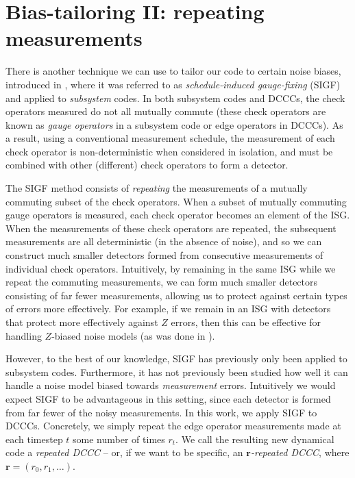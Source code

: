 \section{Bias-tailoring II: repeating measurements}\label{sec:gauge_dcccs}

There is another technique we can use to tailor our code to certain noise biases, introduced in , where it was referred to as \textit{schedule-induced gauge-fixing} (SIGF) and applied to \textit{subsystem} codes.
In both subsystem codes and DCCCs, the check operators measured do not all mutually commute (these check operators are known as \textit{gauge operators} in a subsystem code or edge operators in DCCCs).
As a result, using a conventional measurement schedule, the measurement of each check operator is non-deterministic when considered in isolation, and must be combined with other (different) check operators to form a detector.

The SIGF method consists of \textit{repeating} the measurements of a mutually commuting subset of the check operators.
When a subset of mutually commuting gauge operators is measured, each check operator becomes an element of the ISG.
When the measurements of these check operators are repeated, the subsequent measurements are all deterministic (in the absence of noise), and so we can construct much smaller detectors formed from consecutive measurements of individual check operators.
Intuitively, by remaining in the same ISG while we repeat the commuting measurements, we can form much smaller detectors consisting of far fewer measurements, allowing us to protect against certain types of errors more effectively.
For example, if we remain in an ISG with detectors that protect more effectively against $Z$ errors, then this can be effective for handling $Z$-biased noise models (as was done in ).

However, to the best of our knowledge, SIGF has previously only been applied to subsystem codes.
Furthermore, it has not previously been studied how well it can handle a noise model biased towards \textit{measurement} errors.
Intuitively we would expect SIGF to be advantageous in this setting, since each detector is formed from far fewer of the noisy measurements.
In this work, we apply SIGF to DCCCs.
Concretely, we simply repeat the edge operator measurements made at each timestep $t$ some number of times $r_t$.
We call the resulting new dynamical code a \textit{repeated DCCC} --
or, if we want to be specific, an \emph{$\mathbf{r}$-repeated DCCC}, where $\mathbf{r} = (r_0, r_1, \ldots)$.

